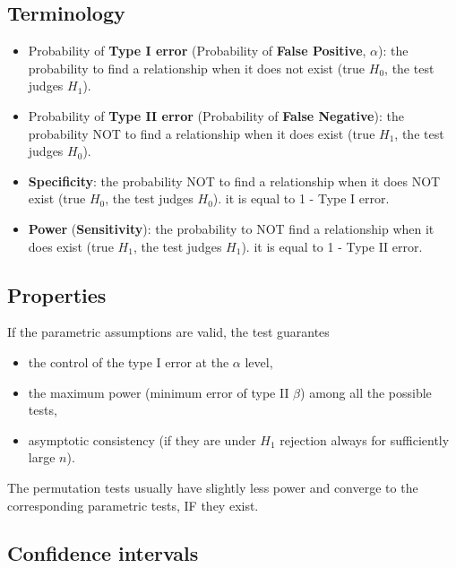 \documentclass[]{article}
\providecommand{\tightlist}{%
  \setlength{\itemsep}{0pt}\setlength{\parskip}{0pt}}
\begin{document}
\subsection{Terminology}\label{terminology}

\begin{itemize}
\item
  Probability of \textbf{Type I error} (Probability of \textbf{False
  Positive}, \(\alpha\)): the probability to find a relationship when it
  does not exist (true \(H_0\), the test judges \(H_1\)).
\item
  Probability of \textbf{Type II error} (Probability of \textbf{False
  Negative}): the probability NOT to find a relationship when it does
  exist (true \(H_1\), the test judges \(H_0\)).
\item
  \textbf{Specificity}: the probability NOT to find a relationship when
  it does NOT exist (true \(H_0\), the test judges \(H_0\)). it is equal
  to 1 - Type I error.
\item
  \textbf{Power} (\textbf{Sensitivity}): the probability to NOT find a
  relationship when it does exist (true \(H_1\), the test judges
  \(H_1\)). it is equal to 1 - Type II error.
\end{itemize}

\subsection{Properties}\label{properties}

If the parametric assumptions are valid, the test guarantes

\begin{itemize}
\tightlist
\item
  the control of the type I error at the \(\alpha\) level,\\
\item
  the maximum power (minimum error of type II \(\beta\)) among all the
  possible tests,\\
\item
  asymptotic consistency (if they are under \(H_1\) rejection always for
  sufficiently large \(n\)).
\end{itemize}

The permutation tests usually have slightly less power and converge to
the corresponding parametric tests, IF they exist.

\subsection{Confidence intervals}\label{confidence-intervals}
\end{document}
